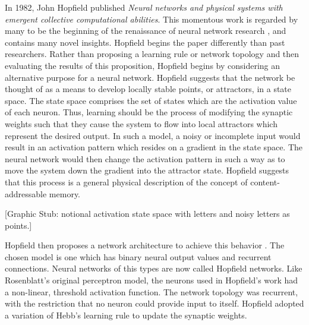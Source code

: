 \documentclass[11pt]{afthesis}
\begin{document}
	In 1982, John Hopfield published \textit{Neural networks and physical systems with emergent collective computational abilities}. This momentous work is regarded by many to be the beginning of the renaissance of neural network research \cite{anderson1988neurocomputing}, and contains many novel insights. Hopfield begins the paper differently than past researchers. Rather than proposing a learning rule or network topology and then evaluating the results of this proposition, Hopfield begins by considering an alternative purpose for a neural network. Hopfield suggests that the network be thought of as a means to develop locally stable points, or attractors, in a state space. The state space comprises the set of states which are the activation value of each neuron. Thus, learning should be the process of modifying the synaptic weights such that they cause the system to flow into local attractors which represent the desired output. In such a model, a noisy or incomplete input would result in an activation pattern which resides on a gradient in the state space. The neural network would then change the activation pattern in such a way as to move the system down the gradient into the attractor state. Hopfield suggests that this process is a general physical description of the concept of content-addressable memory.
	
	[Graphic Stub: notional activation state space with letters and noisy letters as points.]
	
	Hopfield then proposes a network architecture to achieve this behavior \cite{hopfield1982neuralnetworks}. The chosen model is one which has binary neural output values and recurrent connections. Neural networks of this types are now called Hopfield networks. Like Rosenblatt's original perceptron model, the neurons used in Hopfield's work had a non-linear, threshold activation function. The network topology was recurrent, with the restriction that no neuron could provide input to itself. Hopfield adopted a variation of Hebb's learning rule to update the synaptic weights.
	
\end{document}
